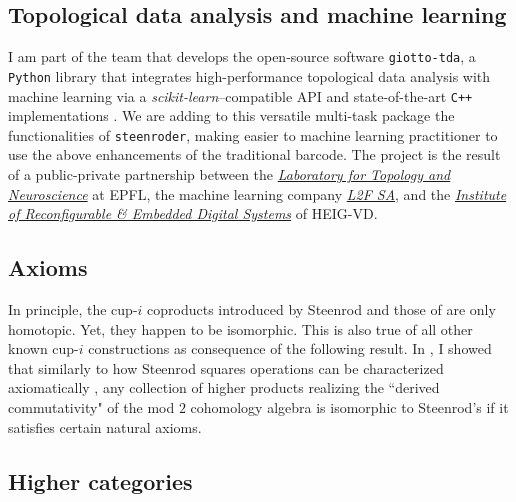 \subsection{Topological data analysis and machine learning} \label{ss:giotto}

I am part of the team that develops the open-source software \texttt{giotto-tda}, a \texttt{Python} library that integrates high-performance topological data analysis with machine learning via a \emph{scikit-learn}--compatible API and state-of-the-art \texttt{C++} implementations \cite{medina2021giotto}.
We are adding to this versatile multi-task package the functionalities of \texttt{steenroder}, making easier to machine learning practitioner to use the above enhancements of the traditional barcode.
The  project is the result of a public-private partnership between the \href{https://www.epfl.ch/labs/hessbellwald-lab/}{\textit{Laboratory for Topology and Neuroscience}} at EPFL, the machine learning company \href{https://www.l2f.ch/}{\textit{L2F SA}}, and the \href{https://heig-vd.ch/en/research/reds}{\textit{Institute of Reconfigurable \& Embedded Digital Systems}} of HEIG-VD.

\subsection{Axioms}

In principle, the cup-$i$ coproducts introduced by Steenrod \cite{steenrod1947products} and those of \cite{medina2021newformulas} are only homotopic.
Yet, they happen to be isomorphic.
This is also true of all other known cup-$i$ constructions \cite{gonzalez-diaz1999steenrod, mcclure2003multivariable, berger2004combinatorial, medina2020prop1} as consequence of the following result.
In \cite{medina2018axiomatic}, I showed that similarly to how Steenrod squares operations can be characterized axiomatically \cite{steenrod1962cohomology}, any collection of higher products realizing the ``derived commutativity" of the mod $2$ cohomology algebra is isomorphic to Steenrod's if it satisfies certain natural axioms.

\subsection{Higher categories}

